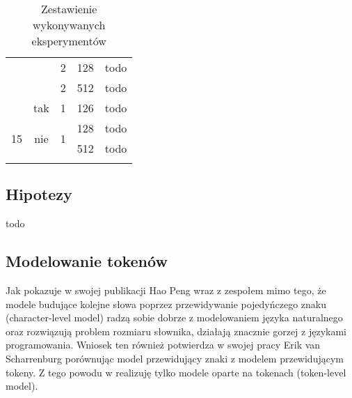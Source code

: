 \begin{table}[ht]
{\begin{tabular}{ccccc}
            \multicolumn{1}{|c|}{}                    & \multicolumn{1}{c|}{}                     & \multicolumn{1}{c|}{2}                  & \multicolumn{1}{c|}{128}                        & \multicolumn{1}{c|}{todo}                         \\ \cline{3-5} 
            \multicolumn{1}{|c|}{}                    & \multicolumn{1}{c|}{}                     & \multicolumn{1}{c|}{2}                  & \multicolumn{1}{c|}{512}                        & \multicolumn{1}{c|}{todo}                         \\ \cline{2-5} 
            \multicolumn{1}{|c|}{}                    & \multicolumn{1}{c|}{tak}                  & \multicolumn{1}{c|}{1}                  & \multicolumn{1}{c|}{126}                        & \multicolumn{1}{c|}{todo}                         \\ \hline
            \multicolumn{1}{|c|}{\multirow{2}{*}{15}} & \multicolumn{1}{c|}{\multirow{2}{*}{nie}} & \multicolumn{1}{c|}{\multirow{2}{*}{1}} & \multicolumn{1}{c|}{128}                        & \multicolumn{1}{c|}{todo}                         \\ \cline{4-5} 
            \multicolumn{1}{|c|}{}                    & \multicolumn{1}{c|}{}                     & \multicolumn{1}{c|}{}                   & \multicolumn{1}{c|}{512}                        & \multicolumn{1}{c|}{todo}                         \\ \hline
                                                      &                                           &                                         &                                                 &                                                  
            \end{tabular}}
    \caption{Zestawienie wykonywanych eksperymentów} 
    \end{table} 

\subsection{Hipotezy}
todo
    
\subsection{Modelowanie tokenów}
Jak pokazuje w swojej publikacji Hao Peng wraz z zespołem \cite{character-level} mimo tego, że modele budujące kolejne słowa poprzez 
przewidywanie pojedyńczego znaku (character-level model) radzą sobie dobrze z modelowaniem języka naturalnego oraz rozwiązują problem rozmiaru słownika, 
działają znacznie gorzej z językami programowania. Wniosek ten również potwierdza w swojej pracy Erik van Scharrenburg \cite{erik} porównując model przewidujący 
znaki z modelem przewidującym tokeny. Z tego powodu w  realizuję tylko modele oparte na tokenach (token-level model). 

